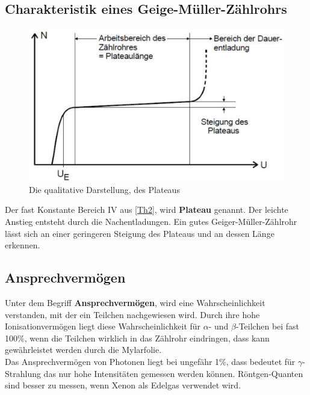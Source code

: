 \subsection{Charakteristik eines Geige-Müller-Zählrohrs}
\begin{figure}[h!]
\centering
\includegraphics[scale=0.75]{Grafiken/Theorie2.pdf}
\caption{Die qualitative Darstellung, des Plateaus \cite{V703}\label{Th3}}
\end{figure}
Der fast Konstante Bereich IV aus  \cref{Th2}, wird \textbf{Plateau} genannt. Der leichte Anstieg entsteht durch die Nachentladungen. Ein gutes Geiger-Müller-Zählrohr lässt sich an einer geringeren Steigung des Plateaus und an dessen Länge erkennen.
\subsection{Ansprechvermögen}
Unter dem Begriff \textbf{Ansprechvermögen}, wird eine Wahrscheinlichkeit verstanden, mit der ein Teilchen nachgewiesen wird. Durch ihre hohe Ionisationvermögen liegt diese Wahrscheinlichkeit für $\alpha$- und $\beta$-Teilchen bei fast 100$\%$, wenn die Teilchen wirklich in das Zählrohr eindringen, dass kann gewährleistet werden durch die Mylarfolie.\\
Das Ansprechvermögen von Photonen liegt bei ungefähr 1$\%$, dass bedeutet für $\gamma$-Strahlung das nur hohe Intensitäten gemessen werden können. Röntgen-Quanten sind besser zu messen, wenn Xenon als Edelgas verwendet wird.